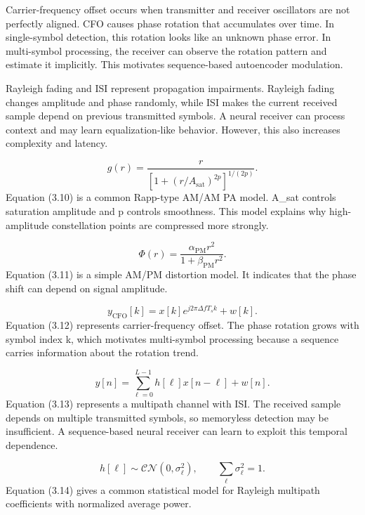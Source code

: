 Carrier-frequency offset occurs when transmitter and receiver oscillators are not perfectly aligned. CFO causes phase rotation that accumulates over time. In single-symbol detection, this rotation looks like an unknown phase error. In multi-symbol processing, the receiver can observe the rotation pattern and estimate it implicitly. This motivates sequence-based autoencoder modulation.

Rayleigh fading and ISI represent propagation impairments. Rayleigh fading changes amplitude and phase randomly, while ISI makes the current received sample depend on previous transmitted symbols. A neural receiver can process context and may learn equalization-like behavior. However, this also increases complexity and latency.

\begin{equation}
g(r)=\frac{r}{\left[1+\left(r/A_{\mathrm{sat}}\right)^{2p}\right]^{1/(2p)}}.
\end{equation}
Equation (3.10) is a common Rapp-type AM/AM PA model. A\_sat controls saturation amplitude and p controls smoothness. This model explains why high-amplitude constellation points are compressed more strongly.

\begin{equation}
\Phi(r)=\frac{\alpha_{\mathrm{PM}}r^2}{1+\beta_{\mathrm{PM}}r^2}.
\end{equation}
Equation (3.11) is a simple AM/PM distortion model. It indicates that the phase shift can depend on signal amplitude.

\begin{equation}
y_{\mathrm{CFO}}[k]=x[k]e^{j2\pi \Delta f T_s k}+w[k].
\end{equation}
Equation (3.12) represents carrier-frequency offset. The phase rotation grows with symbol index k, which motivates multi-symbol processing because a sequence carries information about the rotation trend.

\begin{equation}
y[n]=\sum_{\ell=0}^{L-1}h[\ell]x[n-\ell]+w[n].
\end{equation}
Equation (3.13) represents a multipath channel with ISI. The received sample depends on multiple transmitted symbols, so memoryless detection may be insufficient. A sequence-based neural receiver can learn to exploit this temporal dependence.

\begin{equation}
h[\ell]\sim\mathcal{CN}(0,\sigma_{\ell}^{2}),\qquad \sum_{\ell}\sigma_{\ell}^{2}=1.
\end{equation}
Equation (3.14) gives a common statistical model for Rayleigh multipath coefficients with normalized average power.


